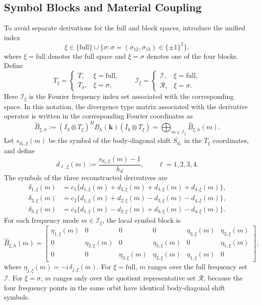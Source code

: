 \documentclass[11pt,oneside]{article}
\numberwithin{equation}{section}
\theoremstyle{plain}
\theoremstyle{remark}
\newcommand{\bk}{\bm{k}}
\begin{document}
\subsection{Symbol Blocks and Material Coupling}

To avoid separate derivations for the full and block spaces, introduce the unified index
\[
\xi\in \{\mathrm{full}\}\cup\{\sigma:\sigma=(\sigma_{12},\sigma_{13})\in\{\pm1\}^2\},
\]
where \(\xi=\mathrm{full}\) denotes the full space and \(\xi=\sigma\) denotes one of the four blocks. Define
\begin{equation}\label{eq:T_xi_I_xi_def}
T_\xi=
\begin{cases}
T, & \xi=\mathrm{full},\\
T_\sigma, & \xi=\sigma,
\end{cases}
\qquad
\mathcal I_\xi=
\begin{cases}
\mathcal I, & \xi=\mathrm{full},\\
\mathcal R, & \xi=\sigma.
\end{cases}
\end{equation}
Here \(\mathcal I_\xi\) is the Fourier frequency index set associated with the corresponding space. In this notation, the divergence type matrix associated with the derivative operator is written in the corresponding Fourier coordinates as
\begin{equation}\label{eq:Bhat_xi_def}
\widehat B_{\xi,h}
:=(I_3\otimes T_\xi)^HB_h(\bk)(I_6\otimes T_\xi)
=\bigoplus_{m\in\mathcal I_\xi}\widehat B_{\xi,h}(m).
\end{equation}
Let \(s_{d_\ell,\xi}(m)\) be the symbol of the body-diagonal shift \(S_{d_\ell}\) in the \(T_\xi\) coordinates, and define
\[
d_{\ell,\xi}(m):=\frac{s_{d_\ell,\xi}(m)-1}{h_d},
\qquad \ell=1,2,3,4.
\]
The symbols of the three reconstructed derivatives are
\begin{align}
\delta_{1,\xi}(m)&=c_1\{d_{1,\xi}(m)+d_{2,\xi}(m)+d_{3,\xi}(m)+d_{4,\xi}(m)\},\label{eq:delta1_xi_unified}\\
\delta_{2,\xi}(m)&=c_2\{d_{1,\xi}(m)+d_{2,\xi}(m)-d_{3,\xi}(m)-d_{4,\xi}(m)\},\label{eq:delta2_xi_unified}\\
\delta_{3,\xi}(m)&=c_3\{d_{1,\xi}(m)-d_{2,\xi}(m)+d_{3,\xi}(m)-d_{4,\xi}(m)\}.\label{eq:delta3_xi_unified}
\end{align}
For each frequency mode \(m\in\mathcal I_\xi\), the local symbol block is
\begin{equation}\label{eq:Bhat_xi_m_def}
\widehat B_{\xi,h}(m)=
\begin{bmatrix}
\eta_{1,\xi}(m)&0&0&0&\eta_{3,\xi}(m)&\eta_{2,\xi}(m)\\
0&\eta_{2,\xi}(m)&0&\eta_{3,\xi}(m)&0&\eta_{1,\xi}(m)\\
0&0&\eta_{3,\xi}(m)&\eta_{2,\xi}(m)&\eta_{1,\xi}(m)&0
\end{bmatrix},
\end{equation}
where \(\eta_{j,\xi}(m)=-\mathrm i\,\delta_{j,\xi}(m)\). For \(\xi=\mathrm{full}\), \(m\) ranges over the full frequency set \(\mathcal I\). For \(\xi=\sigma\), \(m\) ranges only over the quotient representative set \(\mathcal R\), because the four frequency points in the same orbit have identical body-diagonal shift symbols.
\end{document}
